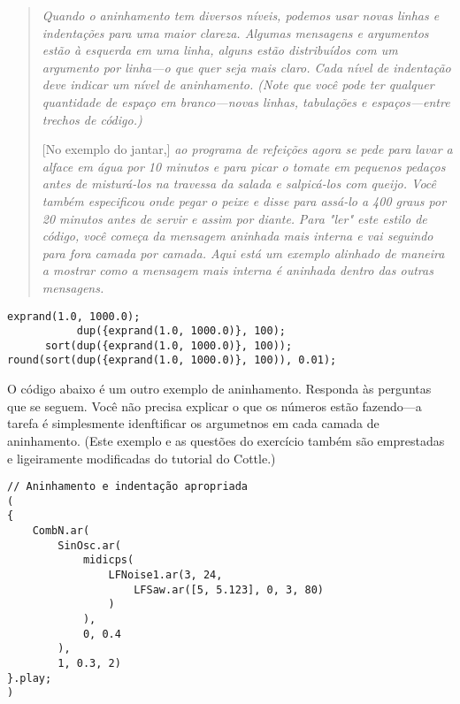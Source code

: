 \begin{quotation}
\textit{Quando o aninhamento tem diversos níveis, podemos usar novas linhas e indentações para uma maior clareza. Algumas mensagens e argumentos estão à esquerda em uma linha, alguns estão distribuídos com um argumento por linha---o que quer seja mais claro. Cada nível de indentação deve indicar um nível de aninhamento. (Note que você pode ter qualquer quantidade de espaço em branco---novas linhas, tabulações e espaços---entre trechos de código.)}

[No exemplo do jantar,]\textit{ ao programa de refeições agora se pede para lavar a alface em água por 10 minutos e para picar o tomate em pequenos pedaços antes de misturá-los na travessa da salada e salpicá-los com queijo. Você também especificou onde pegar o peixe e disse para assá-lo a 400 graus por 20 minutos antes de servir e assim por diante.} 
\textit{Para "ler" este estilo de código, você começa da mensagem aninhada mais interna e vai seguindo para fora camada por camada. Aqui está um exemplo alinhado de maneira a mostrar como a mensagem mais interna é aninhada dentro das outras mensagens.}
\end{quotation}

%

\begin{lstlisting}[style=SuperCollider-IDE, basicstyle=\scttfamily\footnotesize]
                exprand(1.0, 1000.0);
           dup({exprand(1.0, 1000.0)}, 100);
      sort(dup({exprand(1.0, 1000.0)}, 100));
round(sort(dup({exprand(1.0, 1000.0)}, 100)), 0.01);
\end{lstlisting}

O código abaixo é um outro exemplo de aninhamento. Responda às perguntas que se seguem. Você não precisa explicar o que os números estão fazendo---a tarefa é simplesmente idenftificar os argumetnos em cada camada de aninhamento. (Este exemplo e as questões do exercício também são emprestadas e ligeiramente modificadas do tutorial do Cottle.)

 
%

\begin{lstlisting}[style=SuperCollider-IDE, basicstyle=\scttfamily\footnotesize]
// Aninhamento e indentação apropriada
(
{
	CombN.ar(
		SinOsc.ar(
			midicps(
				LFNoise1.ar(3, 24,
					LFSaw.ar([5, 5.123], 0, 3, 80)
				)
			),
			0, 0.4
		),
		1, 0.3, 2)
}.play;
)
\end{lstlisting}

